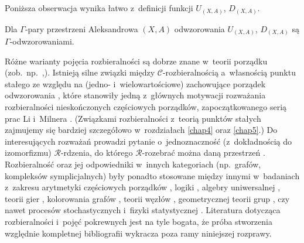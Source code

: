 Poniższa obserwacja wynika łatwo z~definicji funkcji $U_{(X,A)}$, $D_{(X,A)}$.
\begin{lem}\label{standardowy_jest_g}
Dla $\Gamma$-pary przestrzeni Aleksandrowa $(X,A)$ odwzorowania $U_{(X,A)}$, $D_{(X,A)}$ są $\Gamma$-odwzorowaniami.
\end{lem}

Różne warianty pojęcia rozbieralności są dobrze znane w~teorii porządku (zob.~np.~\cite{Li93,Schroder99,Schroder00},\cite[Chapter 4, Exercise 24]{Schroder03}). Istnieją silne związki między $\mathcal{C}$-rozbieralnością a~własnością punktu stałego ze względu na (jedno- i~wielowartościowe) zachowujące porządek odwzorowania  \cite{Schroder99,Schroder03}, które stanowiły jedną z~głównych motywacji rozważania rozbieralności nieskończonych częściowych porządków, zapoczątkowanego serią prac Li i~Milnera \cite{Li92,Li93,LiMilner92,LiMilner93,Li95}. (Związkami rozbieralności z~teorią punktów stałych zajmujemy się bardziej szczegółowo w~rozdziałach \ref{chap4} oraz \ref{chap5}.) Do interesujących rozważań prowadzi pytanie o~jednoznaczność (z~dokładnością do izomorfizmu) $\mathcal{R}$-rdzenia, do którego \mbox{$\mathcal{R}$-rozebrać} można daną przestrzeń \cite{Farley93,Farley97,Schroder00}. Rozbieralność oraz jej odpowiedniki w~innych kategoriach (np.~grafów, kompleksów symplicjalnych) były ponadto stosowane między innymi w~badaniach z~zakresu arytmetyki częściowych porządków \cite[Proposition 10.5.8]{Schroder03}, logiki \cite{Larose07}, algebry uniwersalnej \cite{Larose05,Larose97}, teorii gier \cite{Nowakowski83}, kolorowania grafów \cite{Civan07}, teorii węzłów \cite{Przytycki12}, geometrycznej teorii grup \cite{Chepoi14,Hensel14}, czy nawet procesów stochastycznych i~fizyki statystycznej \cite{Brightwell00,Dyer04}. Literatura dotycząca rozbieralności i~pojęć pokrewnych jest na tyle bogata, że próba stworzenia względnie kompletnej bibliografii wykracza poza ramy niniejszej rozprawy. 




